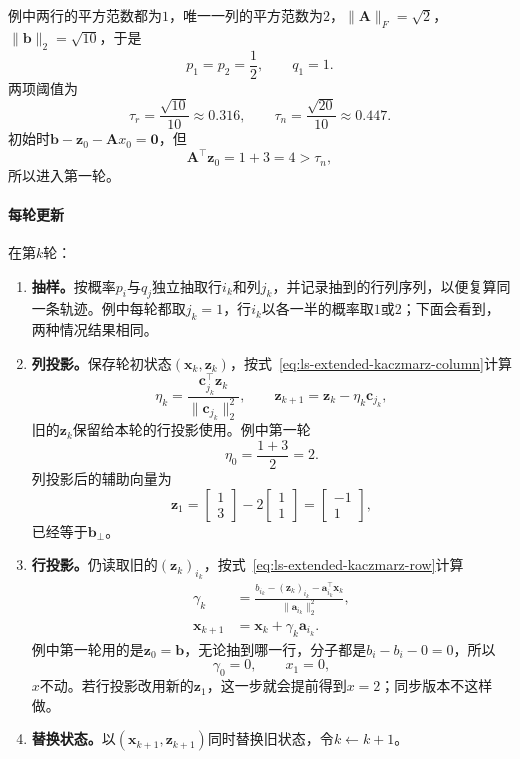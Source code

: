 例中两行的平方范数都为$1$，唯一一列的平方范数为$2$，$\lVert\bm A\rVert_F=\sqrt2$，$\lVert\bm b\rVert_2=\sqrt{10}$，于是
\[
 p_1=p_2=\frac12,\qquad q_1=1 .
\]
两项阈值为
\[
 \tau_r=\frac{\sqrt{10}}{10}\approx0.316,\qquad \tau_n=\frac{\sqrt{20}}{10}\approx0.447 .
\]
初始时$\bm b-\bm z_0-\bm A x_0=\bm0$，但
\[
 \bm A^\top\bm z_0=1+3=4>\tau_n ,
\]
所以进入第一轮。

\paragraph{每轮更新}
在第$k$轮：
\begin{enumerate}
 \item \textbf{抽样。}按概率$p_i$与$q_j$独立抽取行$i_k$和列$j_k$，并记录抽到的行列序列，以便复算同一条轨迹。例中每轮都取$j_k=1$，行$i_k$以各一半的概率取$1$或$2$；下面会看到，两种情况结果相同。

 \item \textbf{列投影。}保存轮初状态$(\bm x_k,\bm z_k)$，按式~\eqref{eq:ls-extended-kaczmarz-column}计算
 \[
  \eta_k=\frac{\bm c_{j_k}^\top\bm z_k}{\lVert\bm c_{j_k}\rVert_2^2},\qquad \bm z_{k+1}=\bm z_k-\eta_k\bm c_{j_k},
 \]
 旧的$\bm z_k$保留给本轮的行投影使用。例中第一轮
 \[
  \eta_0=\frac{1+3}{2}=2 .
 \]
 列投影后的辅助向量为
 \[
  \bm z_1=\begin{bmatrix}1\\3\end{bmatrix}-2\begin{bmatrix}1\\1\end{bmatrix}=\begin{bmatrix}-1\\1\end{bmatrix},
 \]
 已经等于$\bm b_\perp$。

 \item \textbf{行投影。}仍读取旧的$(\bm z_k)_{i_k}$，按式~\eqref{eq:ls-extended-kaczmarz-row}计算
 \[
 \begin{aligned}
  \gamma_k&=\frac{b_{i_k}-(\bm z_k)_{i_k}-\bm a_{i_k}^\top\bm x_k}{\lVert\bm a_{i_k}\rVert_2^2},\\
  \bm x_{k+1}&=\bm x_k+\gamma_k\bm a_{i_k}.
 \end{aligned}
 \]
 例中第一轮用的是$\bm z_0=\bm b$，无论抽到哪一行，分子都是$b_i-b_i-0=0$，所以
 \[
  \gamma_0=0,\qquad x_1=0 ,
 \]
 $x$不动。若行投影改用新的$\bm z_1$，这一步就会提前得到$x=2$；同步版本不这样做。

 \item \textbf{替换状态。}以$(\bm x_{k+1},\bm z_{k+1})$同时替换旧状态，令$k\leftarrow k+1$。


\end{enumerate}
